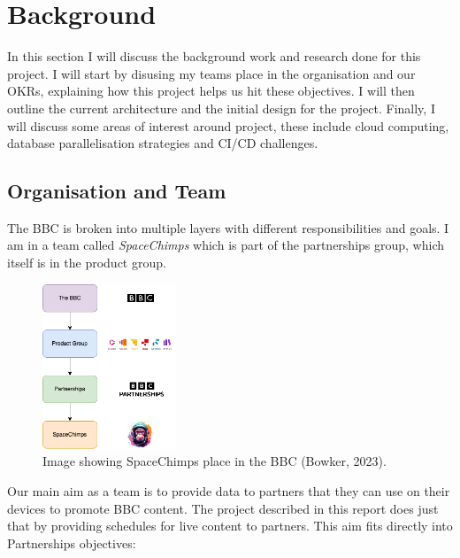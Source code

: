 \section{Background}
  In this section I will discuss the background work and research done for this project. I will start by disusing my teams place in the organisation and 
  our OKRs, explaining how this project helps us hit these objectives. I will then outline the current architecture and the initial design for the project.
  Finally, I will discuss some areas of interest around project, these include cloud computing, database parallelisation strategies and CI/CD challenges.

  \subsection{Organisation and Team}
  The BBC is broken into multiple layers with different responsibilities and goals. I am in a team called \textit{SpaceChimps} which is part of
  the partnerships group, which itself is in the product group.

  \begin{figure}[H]
    \centering
    \includegraphics[width=4cm]{assets/bbcHierarchy.drawio.png}
    \caption{Image showing SpaceChimps place in the BBC (Bowker, 2023).}
    \label{fig:bbcHierarchy}
  \end{figure}

  Our main aim as a team is to provide data to partners that they can use on their devices to promote BBC content. The project described in this report does
  just that by providing schedules for live content to partners. This aim fits directly into Partnerships objectives:

